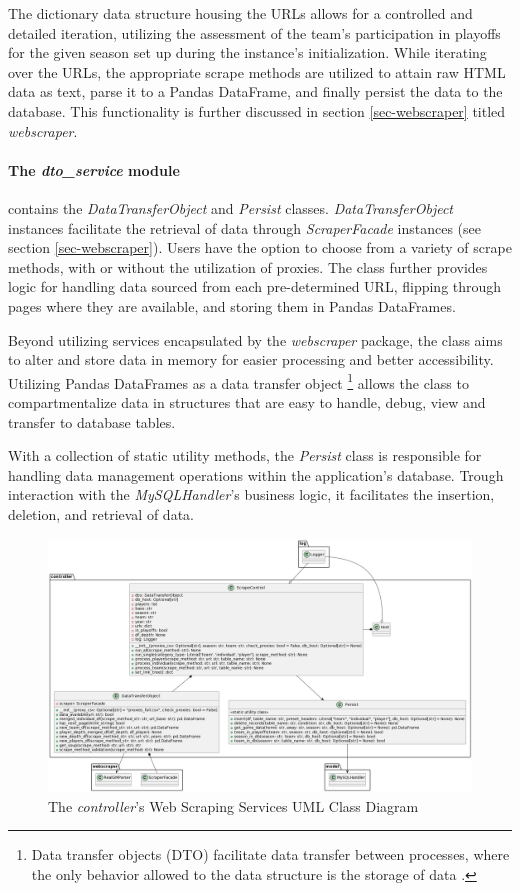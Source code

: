 \documentclass{thesis-ekf}
\theoremstyle{definition}
\theoremstyle{remark}
\begin{document}
The dictionary data structure housing the URLs allows for a controlled and detailed iteration, utilizing the assessment of the team's participation in playoffs for the given season set up during the instance's initialization. While iterating over the URLs, the appropriate scrape methods are utilized to attain raw HTML data as text, parse it to a Pandas DataFrame, and finally persist the data to the database. This functionality is further discussed in section \ref{sec-webscraper} titled \emph{webscraper}.

\paragraph{The \emph{dto\_service} module} contains the \emph{DataTransferObject}\label{element-dto} and \emph{Persist} classes. \emph{DataTransferObject} instances facilitate the retrieval of data through \emph{ScraperFacade} instances (see section \ref{sec-webscraper}). Users have the option to choose from a variety of scrape methods, with or without the utilization of proxies. The class further provides logic for handling data sourced from each pre-determined URL, flipping through pages where they are available, and storing them in Pandas DataFrames. 

Beyond utilizing services encapsulated by the \emph{webscraper} package, the class aims to alter and store data in memory for easier processing and better accessibility. Utilizing Pandas DataFrames as a data transfer object \footnote{Data transfer objects (DTO) facilitate data transfer between processes, where the only behavior allowed to the data structure is the storage of data \cite{dto-wiki}.} allows the class to compartmentalize data in structures that are easy to handle, debug, view and transfer to database tables.

With a collection of static utility methods, the \emph{Persist} class is responsible for handling data management operations within the application's database. Trough interaction with the \emph{MySQLHandler}'s business logic, it facilitates the insertion, deletion, and retrieval of data.

\begin{figure}[th!]
	\centering
	\includegraphics[width=1\linewidth]{img/class/controller_scrapecontrol}
	\caption{The \emph{controller}'s Web Scraping Services UML Class Diagram}
	\label{img-controller-scrapecontrol-class}
\end{figure}
\end{document}
